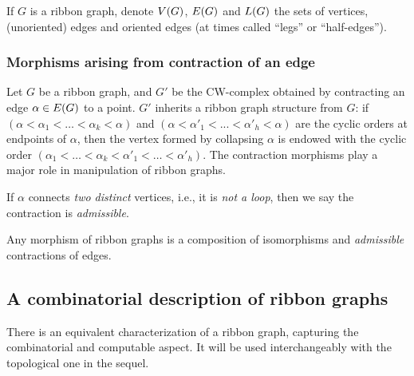 If $G$ is a ribbon graph, denote $V(G)$, $E(G)$ and
$L(G)$ the sets of vertices, (unoriented) edges and oriented edges
(at times called ``legs'' or ``half-edges'').

\subsubsection{Morphisms arising from contraction of an edge}
\label{sec:contractions}
Let $G$ be a ribbon graph, and $G'$ be the CW-complex obtained by
contracting an edge $\alpha \in E(G)$ to a point.  $G'$ inherits a
ribbon graph structure from $G$: if $(\alpha < \alpha_1 < \ldots < \alpha_k < \alpha)$ and $(\alpha
< \alpha'_1 < ... < \alpha'_h < \alpha)$ are the cyclic orders at endpoints of $\alpha$,
then the vertex formed by collapsing $\alpha$ is endowed with the cyclic
order $(\alpha_1 < \ldots < \alpha_k < \alpha'_1 < \ldots < \alpha'_h)$.  The contraction morphisms
play a major role in manipulation of ribbon graphs.

\begin{definition}\label{dfn:admissible-contraction}
  If $\alpha$ connects \emph{two distinct} vertices, i.e., it is \emph{not
    a loop}, then we say the contraction is \emph{admissible}.
\end{definition}

\begin{lemma}\label{lemma:contraction1}
  Any morphism of ribbon graphs is a composition of isomorphisms and
  \emph{admissible} contractions of edges. 
\end{lemma}


\subsection{A combinatorial description of ribbon graphs}
\label{sec:rg-comb}

There is an equivalent characterization of a ribbon graph, capturing
the combinatorial and computable aspect.  It will be used
interchangeably with the topological one in the sequel.

